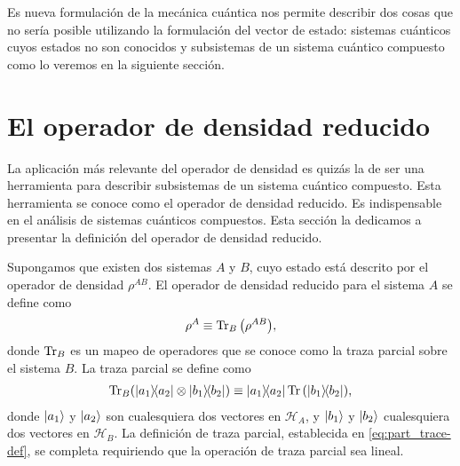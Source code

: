 Es nueva formulación de la mecánica cuántica nos permite describir
dos cosas que no sería posible utilizando la formulación del 
vector de estado:
sistemas cuánticos cuyos estados no son conocidos y
subsistemas de un sistema cuántico compuesto como lo veremos
en la siguiente sección. 

\section{El operador de densidad reducido} %
La aplicación más relevante del operador de densidad es quizás 
la de ser una herramienta para describir subsistemas de un sistema
cuántico compuesto. Esta herramienta se conoce como el operador de
densidad reducido. Es indispensable en el 
análisis de sistemas cuánticos compuestos. Esta sección la 
dedicamos a presentar la definición del operador de densidad 
reducido.

Supongamos que existen dos sistemas $A$ y $B$, cuyo estado está 
descrito por el operador de densidad $\rho^{AB}$. El
operador de densidad reducido para el sistema $A$ se define como
\begin{align}
	\rho^A \equiv \Tr _B\qty(\rho^{AB}),
	\label{eq:partialTrace-def}
\end{align}
donde $\Tr_B$ es un mapeo de operadores que se conoce como
la traza parcial sobre el sistema $B$. La traza parcial
se define como 
\begin{align}
	\Tr_B (\dyad{a_1}{a_2}\otimes \dyad{b_1}{b_2})
	\equiv
	\dyad{a_1}{a_2}\Tr \qty(\dyad{b_1}{b_2}),
	\label{eq:part_trace-def}
\end{align}
donde $\ket{a_1}$ y $\ket{a_2}$ son cualesquiera dos vectores en
$\mathcal{H}_A$, y $\ket{b_1}$ y $\ket{b_2}$ cualesquiera dos vectores
en $\mathcal{H}_B$. La definición de traza parcial, establecida
en \eqref{eq:part_trace-def}, se completa requiriendo que la 
operación de traza parcial sea lineal.

